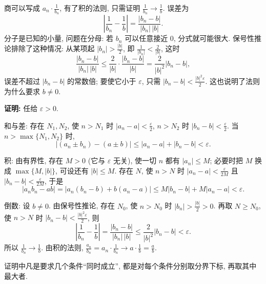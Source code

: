 \documentclass[UTF8,openany]{ctexbook}
\theoremstyle{chinesetextbook}
\newenvironment{cnproof}{\par\indent\textbf{证明:} \ignorespaces}{\par}
\begin{document}
商可以写成 $\displaystyle a_n\cdot\frac1{b_n}$, 有了积的法则, 只需证明 $\displaystyle\frac1{b_n}\to\frac1b$. 误差为
\[
\left|\frac1{b_n}-\frac1b\right|=\frac{|b_n-b|}{|b_n|\,|b|}.
\]
分子是已知的小量, 问题在分母: 若 $b_n$ 可以任意接近 $0$, 分式就可能很大. 保号性推论排除了这种情况: 从某项起 $\displaystyle|b_n|>\frac{|b|}2$, 即 $\displaystyle\frac1{|b_n|}<\frac2{|b|}$, 这时
\[
\frac{|b_n-b|}{|b_n|\,|b|}\le\frac2{|b|}\cdot\frac{|b_n-b|}{|b|}=\frac2{|b|^2}|b_n-b|,
\]
误差不超过 $|b_n-b|$ 的常数倍; 要使它小于 $\varepsilon$, 只需 $\displaystyle|b_n-b|<\frac{|b|^2\varepsilon}2$. 这也说明了法则为什么要求 $b\ne0$.
\begin{cnproof}
任给 $\varepsilon>0$.

和与差: 存在 $N_1,N_2$, 使 $n>N_1$ 时 $\displaystyle|a_n-a|<\frac\varepsilon2$, $n>N_2$ 时 $\displaystyle|b_n-b|<\frac\varepsilon2$. 当 $n>\max\{N_1,N_2\}$ 时,
\[
|(a_n\pm b_n)-(a\pm b)|\le|a_n-a|+|b_n-b|<\varepsilon.
\]

积: 由有界性, 存在 $M>0$ (它与 $\varepsilon$ 无关), 使一切 $n$ 都有 $|a_n|\le M$; 必要时把 $M$ 换成 $\max\{M,|b|\}$, 可设还有 $|b|\le M$. 存在 $N$, 使 $n>N$ 时 $\displaystyle|a_n-a|<\frac\varepsilon{2M}$ 且 $\displaystyle|b_n-b|<\frac\varepsilon{2M}$, 于是
\[
|a_nb_n-ab|=|a_n(b_n-b)+b(a_n-a)|\le M|b_n-b|+M|a_n-a|<\varepsilon.
\]

倒数: 设 $b\ne0$. 由保号性推论, 存在 $N_0$, 使 $n>N_0$ 时 $\displaystyle|b_n|>\frac{|b|}2>0$. 再取 $N\ge N_0$, 使 $n>N$ 时 $\displaystyle|b_n-b|<\frac{|b|^2\varepsilon}2$, 则
\[
\left|\frac1{b_n}-\frac1b\right|=\frac{|b_n-b|}{|b_n|\,|b|}\le\frac2{|b|^2}|b_n-b|<\varepsilon.
\]
所以 $\displaystyle\frac1{b_n}\to\frac1b$. 由积的法则, $\displaystyle\frac{a_n}{b_n}=a_n\cdot\frac1{b_n}\to a\cdot\frac1b=\frac ab$.
\end{cnproof}
证明中凡是要求几个条件“同时成立”, 都是对每个条件分别取分界下标, 再取其中最大者.
\end{document}
